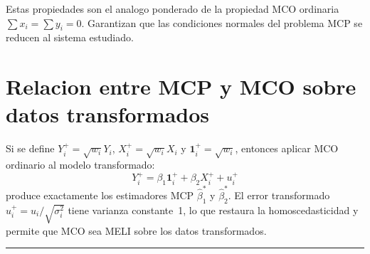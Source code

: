 \documentclass[12pt, letterpaper]{article}
\theoremstyle{remark}
\begin{document}
Estas propiedades son el analogo ponderado de la propiedad MCO ordinaria
$\sum x_i = \sum y_i = 0$. Garantizan que las condiciones normales del problema
MCP se reducen al sistema estudiado.

\section{Relacion entre MCP y MCO sobre datos transformados}

Si se define $Y_i^+ = \sqrt{w_i} Y_i$, $X_i^+ = \sqrt{w_i} X_i$ y
$\mathbf{1}_i^+ = \sqrt{w_i}$, entonces aplicar MCO ordinario al modelo
transformado:
\begin{equation}
  Y_i^+ = \beta_1 \mathbf{1}_i^+ + \beta_2 X_i^+ + u_i^+
\end{equation}
produce exactamente los estimadores MCP $\hat\beta_1^*$ y $\hat\beta_2^*$.
El error transformado $u_i^+ = u_i/\sqrt{\sigma_i^2}$ tiene varianza constante~1,
lo que restaura la homoscedasticidad y permite que MCO sea MELI sobre los
datos transformados.

\vspace{14pt}
\noindent\rule{\linewidth}{0.4pt}

\end{document}
